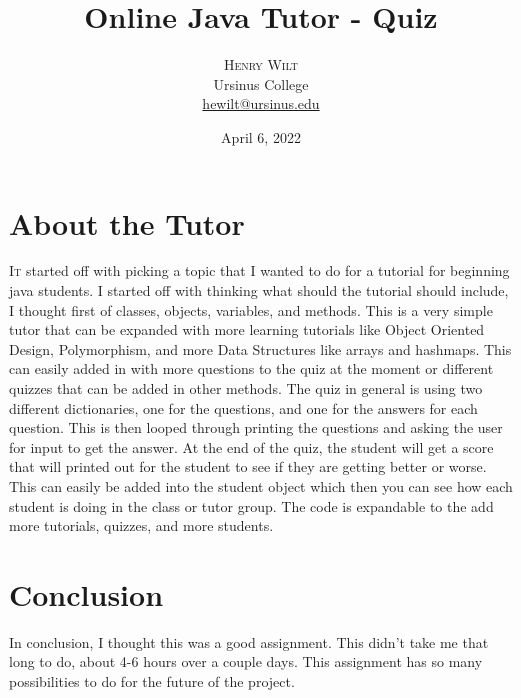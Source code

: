 \documentclass[twoside,twocolumn]{article}
\title{Online Java Tutor - Quiz} %
\author{%
\textsc{Henry Wilt} \\[1ex]%
\normalsize Ursinus College \\ %
\normalsize \href{mailto:hewilt@ursinus.edu}{hewilt@ursinus.edu} %
}
\date{April 6, 2022} %
\begin{document}
\maketitle


\section{About the Tutor}

\lettrine[nindent=0em,lines=2]{I}t started off with picking a topic that I wanted to do for a tutorial for beginning java students. I started off with thinking what should the tutorial should include, I thought first of classes, objects, variables, and methods\cite{assignmentgithub}. This is a very simple tutor that can be expanded with more learning tutorials like Object Oriented Design, Polymorphism, and more Data Structures like arrays and hashmaps. This can easily added in with more questions to the quiz at the moment or different quizzes that can be added in other methods. The quiz in general is using two different dictionaries, one for the questions, and one for the answers for each question. This is then looped through printing the questions and asking the user for input to get the answer. At the end of the quiz, the student will get a score that will printed out for the student to see if they are getting better or worse. This can easily be added into the student object which then you can see how each student is doing in the class or tutor group. The code is expandable to the add more tutorials, quizzes, and more students.



\section{Conclusion}
In conclusion, I thought this was a good assignment. This didn't take me that long to do, about 4-6 hours over a couple days. This assignment has so many possibilities to do for the future of the project.  




\printbibliography %

\end{document}
